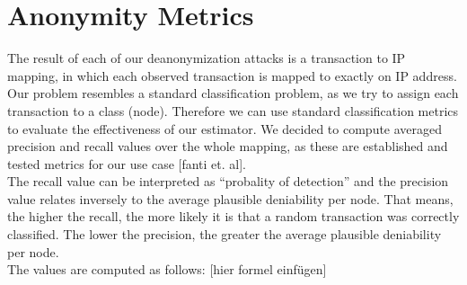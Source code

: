 \section{Anonymity Metrics}
The result of each of our deanonymization attacks is a transaction to IP mapping,
in which each observed transaction is mapped to exactly on IP address. \\
Our problem resembles a standard classification problem, as we try to assign each
transaction to a class (node). Therefore we can use standard classification metrics to
evaluate the effectiveness of our estimator.
We decided to compute averaged precision and recall values over the whole mapping,
as these are established and tested metrics for our use case [fanti et. al]. \\
The recall value can be interpreted as ``probality of detection'' and the
precision value relates inversely to the average plausible deniability per node.
That means, the higher the recall, the more likely it is that a random transaction
was correctly classified. The lower the precision, the greater the average plausible
deniability per node. \\
The values are computed as follows: [hier formel einfügen]
